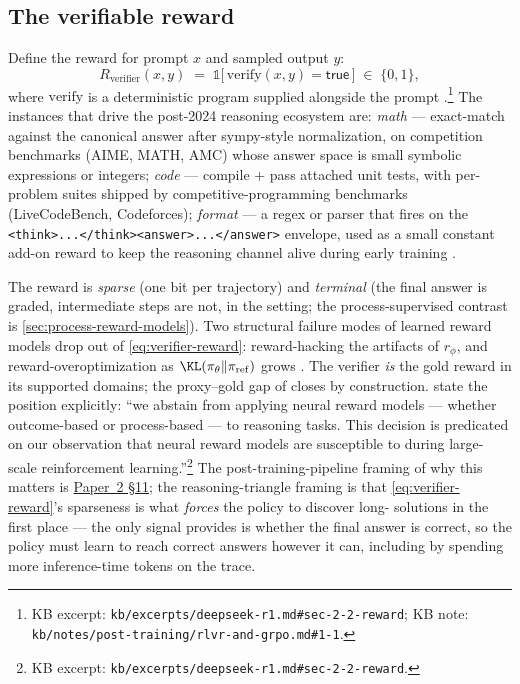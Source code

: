 \subsection{The verifiable reward}
\label{sec:rlvr-verifier-reward}

Define the reward for prompt $x$ and sampled output $y$:
\begin{equation}
R_{\mathrm{verifier}}(x, y) \;=\; \mathbb{1}\!\big[\,\mathrm{verify}(x, y) = \mathsf{true}\,\big] \;\in\; \{0, 1\},
\label{eq:verifier-reward}
\end{equation}
where $\mathrm{verify}$ is a deterministic program supplied alongside
the prompt \citep[\S 2.2]{deepseek-r1}.\footnote{KB excerpt:
\nolinkurl{kb/excerpts/deepseek-r1.md#sec-2-2-reward}; KB note:
\nolinkurl{kb/notes/post-training/rlvr-and-grpo.md#1-1}.} The instances
that drive the post-2024 reasoning ecosystem are: \emph{math} ---
exact-match against the canonical answer after sympy-style
normalization, on competition benchmarks (AIME, MATH, AMC) whose
answer space is small symbolic expressions or integers; \emph{code}
--- compile + pass attached unit tests, with per-problem suites shipped
by competitive-programming benchmarks (LiveCodeBench, Codeforces);
\emph{format} --- a regex or parser that fires on the
\texttt{<think>...</think><answer>...</answer>} envelope, used as a
small constant add-on reward to keep the reasoning channel alive during
early training \citep[\S 2.2]{deepseek-r1}.

The reward is \emph{sparse} (one bit per trajectory) and \emph{terminal}
(the final answer is graded, intermediate steps are not, in the 
setting; the process-supervised contrast is
\cref{sec:process-reward-models}). Two structural failure modes of
learned reward models drop out of \cref{eq:verifier-reward}:
reward-hacking the artifacts of $r_\phi$, and reward-overoptimization
as $\KL(\pi_\theta\|\pi_\mathrm{ref})$ grows \citep[scaling laws for
overoptimization]{ouyang2022-instructgpt}. The verifier
\emph{is} the gold reward in its supported domains; the proxy--gold gap
of  closes by construction. \citet[\S 2.2]{deepseek-r1} state the
position explicitly: ``we abstain from applying neural reward models
--- whether outcome-based or process-based --- to reasoning tasks. This
decision is predicated on our observation that neural reward models are
susceptible to  during large-scale reinforcement
learning.''\footnote{KB excerpt:
\nolinkurl{kb/excerpts/deepseek-r1.md#sec-2-2-reward}.} The
post-training-pipeline framing of why this matters is
\hyperref[P2-sec:rlvr-grpo]{Paper~2 §11}; the reasoning-triangle framing is that
\cref{eq:verifier-reward}'s sparseness is what \emph{forces} the policy
to discover long- solutions in the first place --- the only signal
 provides is whether the final answer is correct, so the policy
must learn to reach correct answers however it can, including by
spending more inference-time tokens on the trace.


